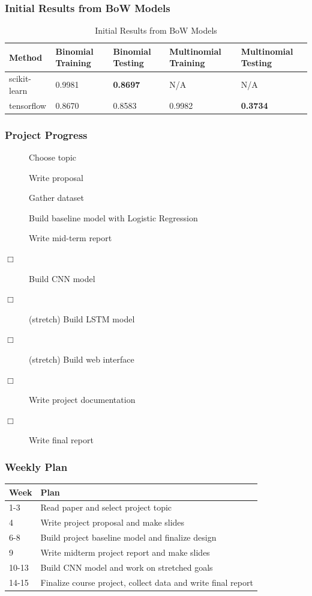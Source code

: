 \documentclass{beamer}
\begin{document}
\begin{frame}
\frametitle{Initial Results from BoW Models}
    \begin{table}[tp]
    \centering
    \caption{Initial Results from BoW Models}
    \begin{tabularx}{\textwidth}{ X  X  X X  X }
    \toprule
        Method & Binomial Training & Binomial Testing & Multinomial Training & Multinomial Testing \\
        \midrule
        scikit-learn & 0.9981 & \textbf{0.8697} & N/A & N/A \\
        tensorflow & 0.8670 & 0.8583 & 0.9982 & \textbf{0.3734} \\
        \bottomrule
    \end{tabularx}
    \end{table}

\end{frame}

\begin{frame}
\frametitle{Project Progress}
    \begin{description}
        \item[\CheckedBox] Choose topic
        \item[\CheckedBox] Write proposal
        \item[\CheckedBox] Gather dataset
        \item[\CheckedBox] Build baseline model with Logistic Regression
        \item[\CheckedBox] Write mid-term report 
        \item[$\Box$] Build CNN model
        \item[$\Box$] (stretch) Build LSTM model
        \item[$\Box$] (stretch) Build web interface
        \item[$\Box$] Write project documentation
        \item[$\Box$] Write final report
    \end{description}
\end{frame}

\begin{frame}
\frametitle{Weekly Plan}
\begin{center}
    \begin{tabular}{| l | p{7cm} |}
        \hline
        Week & Plan \\ \hline
        1-3 & Read paper and select project topic \\ \hline
        4 & Write project proposal and make slides \\ \hline
        6-8 & Build project baseline model and finalize design \\ \hline
        9 & Write midterm project report and make slides \\ \hline
        10-13 & Build CNN model and work on stretched goals \\ \hline
        14-15 & Finalize course project, collect data and write final report \\ \hline
        \end{tabular}
    \end{center}
\end{frame}
\end{document}
